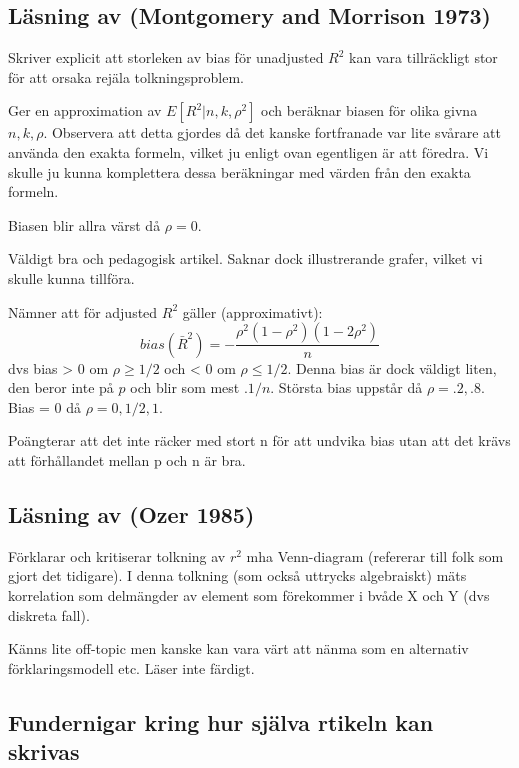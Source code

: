 \documentclass[]{article}
\begin{document}
\subsection{Läsning av (Montgomery and Morrison
1973)}\label{lasning-av-montgomery1973}

Skriver explicit att storleken av bias för unadjusted \(R^2\) kan vara
tillräckligt stor för att orsaka rejäla tolkningsproblem.

Ger en approximation av \(E[R^2|n, k, \rho^2]\) och beräknar biasen för
olika givna \(n, k, \rho\). Observera att detta gjordes då det kanske
fortfranade var lite svårare att använda den exakta formeln, vilket ju
enligt ovan egentligen är att föredra. Vi skulle ju kunna komplettera
dessa beräkningar med värden från den exakta formeln.

Biasen blir allra värst då \(\rho = 0\).

Väldigt bra och pedagogisk artikel. Saknar dock illustrerande grafer,
vilket vi skulle kunna tillföra.

Nämner att för adjusted \(R^2\) gäller (approximativt):
\[bias(\bar{R}^2) = - \frac{\rho^2(1-\rho^2)(1-2\rho^2)}{n}\] dvs bias
\textgreater{} 0 om \(\rho \geq 1/2\) och \textless{} 0 om
\(\rho \leq 1/2\). Denna bias är dock väldigt liten, den beror inte på
\(p\) och blir som mest \(.1/n\). Största bias uppstår då
\(\rho = .2, .8\). Bias = 0 då \(\rho = 0, 1/2, 1\).

Poängterar att det inte räcker med stort n för att undvika bias utan att
det krävs att förhållandet mellan p och n är bra.

\subsection{Läsning av (Ozer 1985)}\label{lasning-av-ozer1985}

Förklarar och kritiserar tolkning av \(r^2\) mha Venn-diagram (refererar
till folk som gjort det tidigare). I denna tolkning (som också uttrycks
algebraiskt) mäts korrelation som delmängder av element som förekommer i
bvåde X och Y (dvs diskreta fall).

Känns lite off-topic men kanske kan vara värt att nänma som en
alternativ förklaringsmodell etc. Läser inte färdigt.

\subsection{Fundernigar kring hur själva rtikeln kan
skrivas}\label{fundernigar-kring-hur-sjalva-rtikeln-kan-skrivas}
\end{document}
